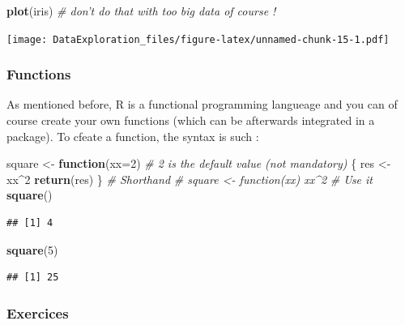 \documentclass[
]{book}
\newenvironment{Shaded}{\begin{snugshade}}{\end{snugshade}}
\newcommand{\CommentTok}[1]{\textcolor[rgb]{0.56,0.35,0.01}{\textit{#1}}}
\newcommand{\ControlFlowTok}[1]{\textcolor[rgb]{0.13,0.29,0.53}{\textbf{#1}}}
\newcommand{\DataTypeTok}[1]{\textcolor[rgb]{0.13,0.29,0.53}{#1}}
\newcommand{\DecValTok}[1]{\textcolor[rgb]{0.00,0.00,0.81}{#1}}
\newcommand{\KeywordTok}[1]{\textcolor[rgb]{0.13,0.29,0.53}{\textbf{#1}}}
\newcommand{\NormalTok}[1]{#1}
\newcommand{\OperatorTok}[1]{\textcolor[rgb]{0.81,0.36,0.00}{\textbf{#1}}}
\newcommand{\StringTok}[1]{\textcolor[rgb]{0.31,0.60,0.02}{#1}}
\begin{document}
\begin{Shaded}
\begin{Highlighting}[]
\KeywordTok{plot}\NormalTok{(iris) }\CommentTok{# don't do that with too big data of course !}
\end{Highlighting}
\end{Shaded}

\texttt{[image: DataExploration\_files/figure-latex/unnamed-chunk-15-1.pdf]}

\hypertarget{functions}{%
\subsubsection{Functions}\label{functions}}

As mentioned before, R is a functional programming langueage and you can of course create your own functions (which can be afterwards integrated in a package). To cfeate a function, the syntax is such :

\begin{Shaded}
\begin{Highlighting}[]
\NormalTok{square <-}\StringTok{ }\ControlFlowTok{function}\NormalTok{(}\DataTypeTok{xx=}\DecValTok{2}\NormalTok{) }\CommentTok{# 2 is the default value (not mandatory)}
\NormalTok{\{}
\NormalTok{  res <-}\StringTok{ }\NormalTok{xx}\OperatorTok{^}\DecValTok{2}
  \KeywordTok{return}\NormalTok{(res)}
\NormalTok{\}}
\CommentTok{# Shorthand}
\CommentTok{# square <- function(xx) xx^2}
\CommentTok{# Use it}
\KeywordTok{square}\NormalTok{()}
\end{Highlighting}
\end{Shaded}

\begin{verbatim}
## [1] 4
\end{verbatim}

\begin{Shaded}
\begin{Highlighting}[]
\KeywordTok{square}\NormalTok{(}\DecValTok{5}\NormalTok{)}
\end{Highlighting}
\end{Shaded}

\begin{verbatim}
## [1] 25
\end{verbatim}

\hypertarget{exercices}{%
\subsubsection{Exercices}\label{exercices}}
\end{document}
